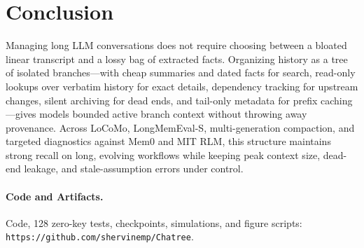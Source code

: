 \documentclass[10pt,twocolumn]{article}
\begin{document}
\section{Conclusion}

Managing long LLM conversations does not require choosing between a bloated linear transcript and a lossy bag of extracted facts. Organizing history as a tree of isolated branches—with cheap summaries and dated facts for search, read-only lookups over verbatim history for exact details, dependency tracking for upstream changes, silent archiving for dead ends, and tail-only metadata for prefix caching—gives models bounded active branch context without throwing away provenance. Across LoCoMo, LongMemEval-S, multi-generation compaction, and targeted diagnostics against Mem0 and MIT RLM, this structure maintains strong recall on long, evolving workflows while keeping peak context size, dead-end leakage, and stale-assumption errors under control.

\paragraph{Code and Artifacts.}
Code, 128 zero-key tests, checkpoints, simulations, and figure scripts: \texttt{https://github.com/shervinemp/Chatree}.

\clearpage


\end{document}
